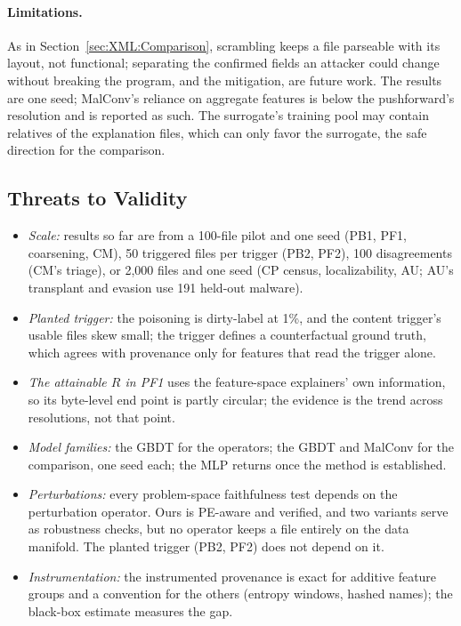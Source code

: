 \paragraph{Limitations.} As in Section~\ref{sec:XML:Comparison}, scrambling keeps a file parseable with its layout, not functional; separating the confirmed fields an attacker could change without breaking the program, and the mitigation, are future work. The results are one seed; MalConv's reliance on aggregate features is below the pushforward's resolution and is reported as such. The surrogate's training pool may contain relatives of the explanation files, which can only favor the surrogate, the safe direction for the comparison.

\subsection{Threats to Validity}

\begin{itemize}[noitemsep, topsep=2pt]
    \item \textit{Scale:} results so far are from a 100-file pilot and one seed (PB1, PF1, coarsening, CM), 50 triggered files per trigger (PB2, PF2), 100 disagreements (CM's triage), or 2{,}000 files and one seed (CP census, localizability, AU; AU's transplant and evasion use 191 held-out malware).
    \item \textit{Planted trigger:} the poisoning is dirty-label at 1\%, and the content trigger's usable files skew small; the trigger defines a counterfactual ground truth, which agrees with provenance only for features that read the trigger alone.
    \item \textit{The attainable $R$ in PF1} uses the feature-space explainers' own information, so its byte-level end point is partly circular; the evidence is the trend across resolutions, not that point.
    \item \textit{Model families:} the GBDT for the operators; the GBDT and MalConv for the comparison, one seed each; the MLP returns once the method is established.
    \item \textit{Perturbations:} every problem-space faithfulness test depends on the perturbation operator. Ours is PE-aware and verified, and two variants serve as robustness checks, but no operator keeps a file entirely on the data manifold. The planted trigger (PB2, PF2) does not depend on it.
    \item \textit{Instrumentation:} the instrumented provenance is exact for additive feature groups and a convention for the others (entropy windows, hashed names); the black-box estimate measures the gap.
\end{itemize}

